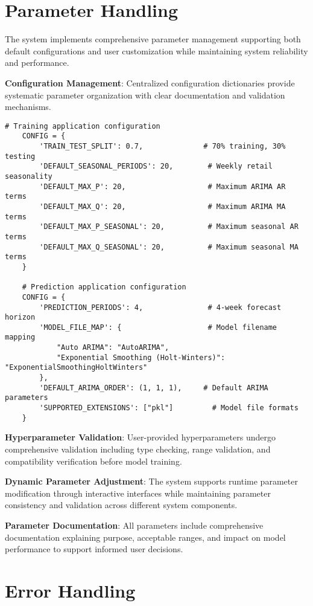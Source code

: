 \section{Parameter Handling}

The system implements comprehensive parameter management supporting both default configurations and user customization while maintaining system reliability and performance.

\textbf{Configuration Management}: Centralized configuration dictionaries provide systematic parameter organization with clear documentation and validation mechanisms.

\begin{lstlisting}[style=bashstyle, caption={Configuration Parameter Management}]
	# Training application configuration
	CONFIG = {
		'TRAIN_TEST_SPLIT': 0.7,              # 70% training, 30% testing
		'DEFAULT_SEASONAL_PERIODS': 20,        # Weekly retail seasonality
		'DEFAULT_MAX_P': 20,                   # Maximum ARIMA AR terms
		'DEFAULT_MAX_Q': 20,                   # Maximum ARIMA MA terms
		'DEFAULT_MAX_P_SEASONAL': 20,          # Maximum seasonal AR terms
		'DEFAULT_MAX_Q_SEASONAL': 20,          # Maximum seasonal MA terms
	}
	
	# Prediction application configuration
	CONFIG = {
		'PREDICTION_PERIODS': 4,               # 4-week forecast horizon
		'MODEL_FILE_MAP': {                    # Model filename mapping
			"Auto ARIMA": "AutoARIMA",
			"Exponential Smoothing (Holt-Winters)": "ExponentialSmoothingHoltWinters"
		},
		'DEFAULT_ARIMA_ORDER': (1, 1, 1),     # Default ARIMA parameters
		'SUPPORTED_EXTENSIONS': ["pkl"]         # Model file formats
	}
\end{lstlisting}

\textbf{Hyperparameter Validation}: User-provided hyperparameters undergo comprehensive validation including type checking, range validation, and compatibility verification before model training.

\textbf{Dynamic Parameter Adjustment}: The system supports runtime parameter modification through interactive interfaces while maintaining parameter consistency and validation across different system components.

\textbf{Parameter Documentation}: All parameters include comprehensive documentation explaining purpose, acceptable ranges, and impact on model performance to support informed user decisions.

\section{Error Handling}

